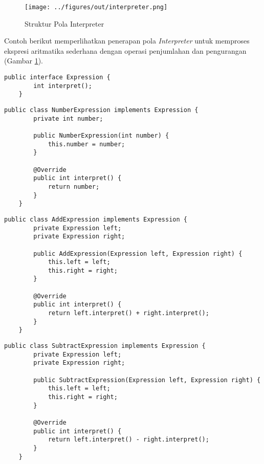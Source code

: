 \begin{figure}[h]
	\centering
	\texttt{[image: ../figures/out/interpreter.png]}
	\caption{Struktur Pola Interpreter}
	\label{fig:interpreter}
\end{figure}


Contoh berikut memperlihatkan penerapan pola \textit{Interpreter} untuk memproses ekspresi aritmatika sederhana dengan operasi penjumlahan dan pengurangan (Gambar \ref{fig:interpreter}).

\begin{lstlisting}[style=JavaStyle, caption={Antarmuka Ekspresi}, label={lst:interpreter-interface}]
	public interface Expression {
		int interpret();
	}
\end{lstlisting}

\begin{lstlisting}[style=JavaStyle, caption={Ekspresi Konstanta (Leaf)}, label={lst:interpreter-number}]
	public class NumberExpression implements Expression {
		private int number;
		
		public NumberExpression(int number) {
			this.number = number;
		}
		
		@Override
		public int interpret() {
			return number;
		}
	}
\end{lstlisting}

\begin{lstlisting}[style=JavaStyle, caption={Ekspresi Penjumlahan}, label={lst:interpreter-plus}]
	public class AddExpression implements Expression {
		private Expression left;
		private Expression right;
		
		public AddExpression(Expression left, Expression right) {
			this.left = left;
			this.right = right;
		}
		
		@Override
		public int interpret() {
			return left.interpret() + right.interpret();
		}
	}
\end{lstlisting}

\begin{lstlisting}[style=JavaStyle, caption={Ekspresi Pengurangan}, label={lst:interpreter-minus}]
	public class SubtractExpression implements Expression {
		private Expression left;
		private Expression right;
		
		public SubtractExpression(Expression left, Expression right) {
			this.left = left;
			this.right = right;
		}
		
		@Override
		public int interpret() {
			return left.interpret() - right.interpret();
		}
	}
\end{lstlisting}

